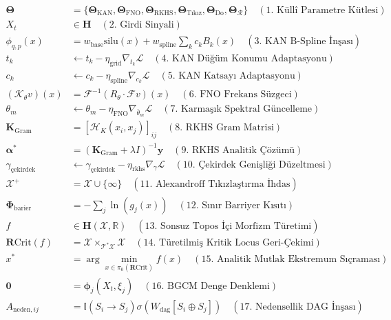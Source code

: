 \documentclass[11pt, a4paper]{article}
\begin{document}
\begin{align}
\bm{\Theta} &= \{ \bm{\Theta}_{\text{KAN}}, \bm{\Theta}_{\text{FNO}}, \bm{\Theta}_{\text{RKHS}}, \bm{\Theta}_{\text{Tıkız}}, \bm{\Theta}_{\text{Do}}, \bm{\Theta}_{\mathcal{R}} \} \quad (\text{1. Küllî Parametre Kütlesi}) \\
X_t &\in \mathbf{H} \quad (\text{2. Girdi Sinyali}) \\
\phi_{q,p}(x) &= w_{\text{base}} \text{silu}(x) + w_{\text{spline}} \sum_k c_k B_k(x) \quad (\text{3. KAN B-Spline İnşası}) \\
t_k &\leftarrow t_k - \eta_{\text{grid}} \nabla_{t_k} \mathcal{L} \quad (\text{4. KAN Düğüm Konumu Adaptasyonu}) \\
c_k &\leftarrow c_k - \eta_{\text{spline}} \nabla_{c_k} \mathcal{L} \quad (\text{5. KAN Katsayı Adaptasyonu}) \\
(\mathcal{K}_\theta v)(x) &= \mathcal{F}^{-1}(R_\theta \cdot \mathcal{F}v)(x) \quad (\text{6. FNO Frekans Süzgeci}) \\
\theta_m &\leftarrow \theta_m - \eta_{\text{FNO}} \nabla_{\bar{\theta}_m} \mathcal{L} \quad (\text{7. Karmaşık Spektral Güncelleme}) \\
\mathbf{K}_{\text{Gram}} &= [\mathcal{H}_K(x_i, x_j)]_{ij} \quad (\text{8. RKHS Gram Matrisi}) \\
\bm{\alpha}^* &= (\mathbf{K}_{\text{Gram}} + \lambda I)^{-1} \mathbf{y} \quad (\text{9. RKHS Analitik Çözümü}) \\
\gamma_{\text{çekirdek}} &\leftarrow \gamma_{\text{çekirdek}} - \eta_{\text{rkhs}} \nabla_\gamma \mathcal{L} \quad (\text{10. Çekirdek Genişliği Düzeltmesi}) \\
\mathcal{X}^+ &= \mathcal{X} \cup \{\infty\} \quad (\text{11. Alexandroff Tıkızlaştırma İhdas}) \\
\mathbf{\Phi}_{\text{barier}} &= -\sum_j \ln(g_j(x)) \quad (\text{12. Sınır Barriyer Kısıtı}) \\
f &\in \mathbf{H}(\mathcal{X}, \mathbb{R}) \quad (\text{13. Sonsuz Topos İçi Morfizm Türetimi}) \\
\mathbf{R}\text{Crit}(f) &= \mathcal{X} \times_{\mathcal{T}^*\mathcal{X}} \mathcal{X} \quad (\text{14. Türetilmiş Kritik Locus Geri-Çekimi}) \\
x^* &= \arg\min_{x \in \pi_0(\mathbf{R}\text{Crit})} f(x) \quad (\text{15. Analitik Mutlak Ekstremum Sıçraması}) \\
\mathbf{0} &= \bm{\phi}_j(X_t, \xi_j) \quad (\text{16. BGCM Denge Denklemi}) \\
A_{\text{neden}, ij} &= \mathbb{I}(S_i \to S_j) \sigma(W_{\text{dag}}[S_i \oplus S_j]) \quad (\text{17. Nedensellik DAG İnşası}) \\

\end{align}
\end{document}
